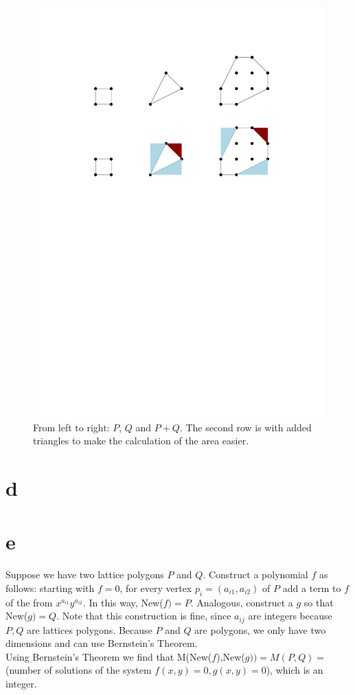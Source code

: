 \documentclass[paper=a4, fontsize=11pt]{scrartcl} %
\theoremstyle{plain}
\begin{document}
\begin{figure}[htbp]
   \centering
   \includegraphics{Images/ConvexLattice.pdf} %
   \caption{From left to right: $P$, $Q$ and $P+Q$. The second row is with added triangles to make the calculation of the area easier.}
   \label{fig:cl}
\end{figure}
\section{d}

\section{e}
Suppose we have two lattice polygons $P$ and $Q$. Construct a polynomial $f$ as follows: starting with $f=0$, for every vertex $p_{i} = (a_{i1},a_{i2})$ of $P$ add a term to $f$ of the from $x^{a_{i1}}y^{a_{i2}}$. In this way, New($f) = P$. Analogous, construct a $g$ so that New($g)=Q$. Note that this construction is fine, since $a_{ij}$ are integers because $P,Q$ are lattices polygons. Because $P$ and $Q$ are polygons, we only have two dimensions and can use Bernstein's Theorem.\\
Using Bernstein's Theorem we find that M(New($f$),New($g)) = M(P,Q)= $ (number of solutions of the system $f(x,y)=0,g(x,y)=0$), which is an integer. 
\end{document}
